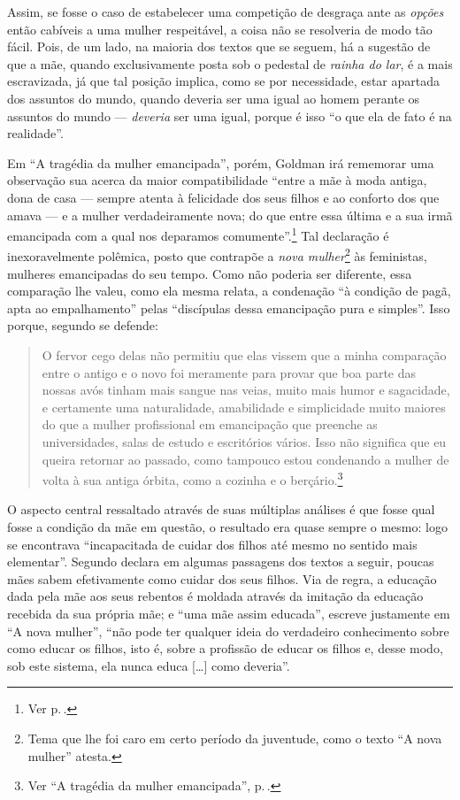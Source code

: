 Assim, se fosse o caso de
estabelecer uma competição de desgraça ante as \textit{opções} então cabíveis
a uma mulher respeitável, a coisa não se resolveria de modo tão fácil.
Pois, de um lado, na maioria dos textos que se seguem, há a sugestão de
que a mãe, quando exclusivamente posta sob o pedestal de \textit{rainha do
lar}, é a mais escravizada, já que tal posição implica, como se por
necessidade, estar apartada dos assuntos do mundo, quando deveria ser
uma igual ao homem perante os assuntos do mundo --- \emph{deveria} ser
uma igual, porque é isso ``o que ela de fato é na realidade''.

Em ``A
tragédia da mulher emancipada'', porém, Goldman irá rememorar uma
observação sua acerca da maior compatibilidade ``entre a mãe à moda antiga, dona de casa ---
sempre atenta à felicidade dos seus filhos e ao conforto dos que
amava --- e a mulher verdadeiramente nova; do que entre essa última e a sua
irmã emancipada com a qual nos deparamos comumente''.\footnote{Ver p.\,\pageref{mae}.} Tal declaração é inexoravelmente polêmica, posto que
contrapõe a \textit{nova mulher}\footnote{Tema que lhe foi caro em certo período da
juventude, como o texto ``A nova mulher'' atesta.} às
feministas, mulheres emancipadas do seu tempo. Como não poderia ser
diferente, essa comparação lhe valeu, como ela mesma relata, a condenação
``à condição de pagã,
apta ao empalhamento'' pelas ``discípulas dessa emancipação pura e
simples''. Isso porque, segundo se defende:

\begin{quote}
O fervor cego delas não permitiu que elas vissem que a
minha comparação entre o antigo e o novo foi meramente para provar que
boa parte das nossas avós tinham mais sangue nas veias, muito mais humor
e sagacidade, e certamente uma naturalidade, amabilidade e simplicidade
muito maiores do que a mulher profissional em emancipação que preenche
as universidades, salas de estudo e escritórios vários. Isso não
significa que eu queira retornar ao passado, como tampouco estou condenando a mulher de volta à sua antiga órbita, como a cozinha e o berçário.\footnote{Ver ``A tragédia da mulher emancipada'', p.\,\pageref{mae}.}
\end{quote}

O aspecto central ressaltado através de suas múltiplas análises é que
fosse qual fosse a condição da mãe em questão, o resultado era quase
sempre o mesmo: logo se encontrava ``incapacitada de cuidar dos filhos
até mesmo no sentido mais elementar''. Segundo declara em algumas
passagens dos textos a seguir, poucas mães sabem efetivamente como
cuidar dos seus filhos. Via de regra, a educação dada pela mãe aos seus
rebentos é moldada através da imitação da educação recebida da sua
própria mãe; e ``uma mãe assim educada'', escreve justamente em ``A nova
mulher'', ``não pode ter qualquer ideia do verdadeiro conhecimento sobre
como educar os filhos, isto é, sobre a profissão de educar os filhos e,
desse modo, sob este sistema, ela nunca educa {[}\ldots{]} como deveria''.

